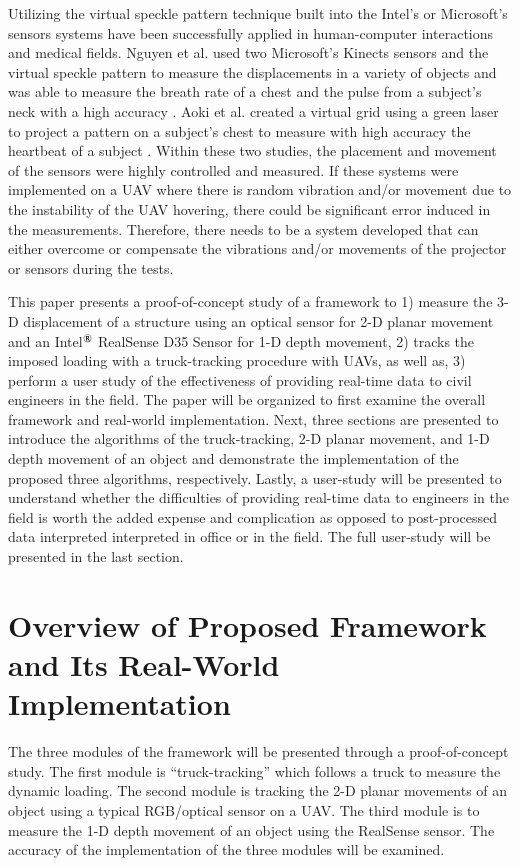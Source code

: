 \documentclass{sigchi}
\begin{document}
Utilizing the virtual speckle pattern technique built into the Intel's or Microsoft's sensors systems have been successfully applied in human-computer interactions and medical fields. Nguyen et al. used two Microsoft's Kinects sensors and the virtual speckle pattern to measure the displacements in a variety of objects and was able to measure the breath rate of a chest and the pulse from a subject's neck with a high accuracy \cite{Nguyen2018}. Aoki et al. created a virtual grid using a green laser to project a pattern on a subject's chest to measure with high accuracy the heartbeat of a subject \cite{Aoki2018StudySensor}. Within these two studies, the placement and movement of the sensors were highly controlled and measured. If these systems were implemented on a UAV where there is random vibration and/or movement due to the instability of the UAV hovering, there could be significant error induced in the measurements. Therefore, there needs to be a system developed that can either overcome or compensate the vibrations and/or movements of the projector or sensors during the tests. 

This paper presents a proof-of-concept study of a framework to 1) measure the 3-D displacement of a structure using an optical sensor for 2-D planar movement and an Intel$^{\text{\textregistered}}$ RealSense D35 Sensor for 1-D depth movement, 2) tracks the imposed loading with a truck-tracking procedure with UAVs, as well as, 3) perform a user study of the effectiveness of providing real-time data to civil engineers in the field. The paper will be organized to first examine the overall framework and real-world implementation. Next, three sections are presented to introduce the algorithms of the truck-tracking, 2-D planar movement, and 1-D depth movement of an object and demonstrate the implementation of the proposed three algorithms, respectively. Lastly, a user-study will be presented to understand whether the difficulties of providing real-time data to engineers in the field is worth the added expense and complication as opposed to post-processed data interpreted interpreted in office or in the field. The full user-study will be presented in the last section.

\section{Overview of Proposed Framework and Its Real-World Implementation}

The three modules of the framework will be presented through a proof-of-concept study. The first module is ``truck-tracking'' which follows a truck to measure the dynamic loading. The second module is tracking the 2-D planar movements of an object using a typical RGB/optical sensor on a UAV. The third module is to measure the 1-D depth movement of an object using the RealSense sensor. The accuracy of the implementation of the three modules will be examined.
\end{document}

